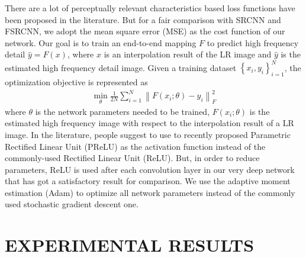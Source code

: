 \documentclass{article}
\begin{document}
There are a lot of perceptually relevant characteristics based loss functions have been proposed in the literature. But for a fair comparison with SRCNN and FSRCNN, we adopt the mean square error (MSE) as the cost function of our network. Our goal is to train an end-to-end mapping $F$ to predict high frequency detail $\hat y = F\left( x \right)$, where $x$ is an interpolation result of the LR image and $\hat y$ is the estimated high frequency detail image. Given a training dataset $\left\{ {{x_i},{y_i}} \right\}_{i = 1}^N$, the optimization objective is represented as
\begin{eqnarray}
\mathop {\min }\limits_\theta  \frac{1}{{2N}}\sum\nolimits_{i = 1}^N {\left\| {F\left( {{x_i};\theta } \right) - {y_i}} \right\|} _F^2
\end{eqnarray}
where $\theta $ is the network parameters needed to be trained, ${F\left( {{x_i};\theta } \right)}$ is the estimated high frequency image with respect to the interpolation result of a LR image. In the literature, people suggest to use to recently proposed Parametric Rectified Linear Unit (PReLU) as the activation function instead of the commonly-used Rectified Linear Unit (ReLU). But, in order to reduce parameters, ReLU is used after each convolution layer in our very deep network that has got a satisfactory result for comparison. We use the adaptive moment estimation (Adam) \cite{ref16} to optimize all network parameters instead of the commonly used stochastic gradient descent one.

\section{EXPERIMENTAL RESULTS}
\label{sec:experimental}
\end{document}
